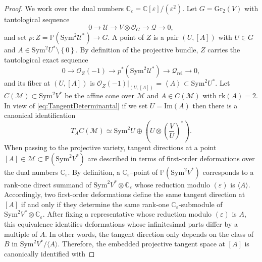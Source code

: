 \documentclass[11pt]{article}
\numberwithin{equation}{section}
\numberwithin{figure}{section}
\theoremstyle{plain}
\theoremstyle{definition}
\theoremstyle{remark}
\newcommand{\C}{\mathbb{C}}
\renewcommand{\P}{\mathbb{P}}
\newcommand{\Gr}{\mathrm{Gr}}
\newcommand{\Sym}{\mathrm{Sym}}
\begin{document}
\begin{proof}
We work over the dual numbers $\C_\varepsilon = \C\left[ \varepsilon\right] / \left(\varepsilon^2\right)$. Let $G=\Gr_2\left( V \right)$ with tautological sequence
\[
0\to \mathcal{U} \to V\otimes \mathcal{O}_G \to \mathcal{Q} \to 0,
\]
and set $p:Z=\P\left( \Sym^2\mathcal{U}^\ast  \right)\rightarrow G$. A point of $Z$ is a pair $\left( U,\left[ A\right]\right)$ with $U\in G$ and
$A\in\Sym^2U^\ast\setminus\left\{ 0\right\}$.
By definition of the projective bundle, $Z$ carries the tautological exact sequence
\begin{equation}\label{eq:tautologicalZ}
0\longrightarrow \mathcal{O}_Z\left( -1\right)
\longrightarrow p^\ast\left( \Sym^2\mathcal{U}^\ast\right)
\longrightarrow \mathcal{Q}_{\mathrm{rel}}
\longrightarrow 0,
\end{equation}
and its fiber at $\left( U,\left[ A\right]\right)$ is $\mathcal{O}_Z\left( -1\right)\big|_{\left( U,\left[ A\right]\right)}
=
\left\langle A\right\rangle
\subset \Sym^2U^\ast$.
Let $C \left( \mathcal{M} \right)\subset \Sym^2V^\ast$ be the affine cone over
$\mathcal{M}$ and $A\in C \left( \mathcal{M} \right)$ with $\mathrm{rk}\left( A\right)=2$. In view of \eqref{eq:TangentDeterminantal} if we set $U=\mathrm{Im}\left( A \right)$ then there is a canonical identification
\begin{equation}\label{eq:tangentSplitting}
T_AC \left( \mathcal{M} \right)\simeq \Sym^2U \oplus \left( U\otimes \left(\frac{V}{U}\right)^\ast\right).
\end{equation}
When passing to the projective variety, tangent directions at a point $\left[A\right]\in \mathcal M\subset \mathbb P\left(\Sym^2V^\ast\right)$ are described in terms of
first-order deformations over the dual numbers $\C_\varepsilon$. By definition, a $\C_\varepsilon$--point of $\mathbb P\left(\Sym^2V^\ast\right)$
corresponds to a rank-one direct summand of $\Sym^2V^\ast\otimes \C_\varepsilon$ whose reduction modulo $\left(\varepsilon\right)$
is $\langle A\rangle$.
Accordingly, two first-order deformations define the same tangent direction at $\left[A\right]$ if and only if they determine the same rank-one
$\C_\varepsilon$-submodule of $\Sym^2V^\ast\otimes \C_\varepsilon$. After fixing a representative whose reduction modulo $\left(\varepsilon\right)$ is
$A$, this equivalence identifies deformations whose infinitesimal parts differ by a multiple of $A$.
In other words, the tangent direction only depends on the class of $B$ in $\Sym^2V^\ast/\langle A\rangle$.
Therefore, the embedded projective tangent space at $\left[A\right]$ is canonically identified with 

\end{proof}
\end{document}
